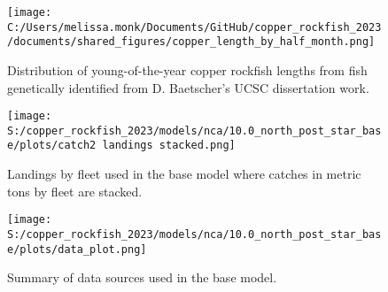 \documentclass[11pt,
  letterpaper,
]{article}
\begin{document}
\FloatBarrier

\begin{figure}
{\centering
\texttt{[image: C:/Users/melissa.monk/Documents/GitHub/copper\_rockfish\_2023/documents/shared\_figures/copper\_length\_by\_half\_month.png]}
}
\caption{Distribution of young-of-the-year copper rockfish lengths from fish genetically identified from D. Baetscher's UCSC dissertation work.\label{fig:copper-smurf-length}}
\end{figure}

\pagebreak

\begin{figure}
{\centering
\texttt{[image: S:/copper\_rockfish\_2023/models/nca/10.0\_north\_post\_star\_base/plots/catch2 landings stacked.png]}
}
\caption{Landings by fleet used in the base model where catches in metric tons by fleet are stacked.\label{fig:catch}}
\end{figure}

\pagebreak

\begin{figure}
{\centering
\texttt{[image: S:/copper\_rockfish\_2023/models/nca/10.0\_north\_post\_star\_base/plots/data\_plot.png]}
}
\caption{Summary of data sources used in the base model.\label{fig:data-plot}}
\end{figure}
\end{document}

